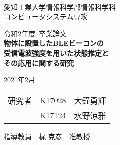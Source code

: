 \begin{titlepage}

\ \\
\begin{center}

{\LARGE 愛知工業大学情報科学部情報科学科\\
コンピュータシステム専攻

\vspace{1.0cm}

令和2年度~卒業論文\\

\vspace{2.0cm}
{\Huge 
\baselineskip=15mm
\textbf{物体に設置したBLEビーコンの\\受信電波強度を用いた状態推定と\\その応用に関する研究\\}}

\vspace{7.0cm}

2021年2月\\

\vspace{1.0cm}

\begin{tabular}[h]{lll}
  研究者  & K17028 & 大鐘勇輝\\
         & K17124 & 水野涼雅\\
\end{tabular}

\vspace{1.0cm}

指導教員\ \ 梶 克彦\ \ 准教授}

\end{center}

\end{titlepage}
    